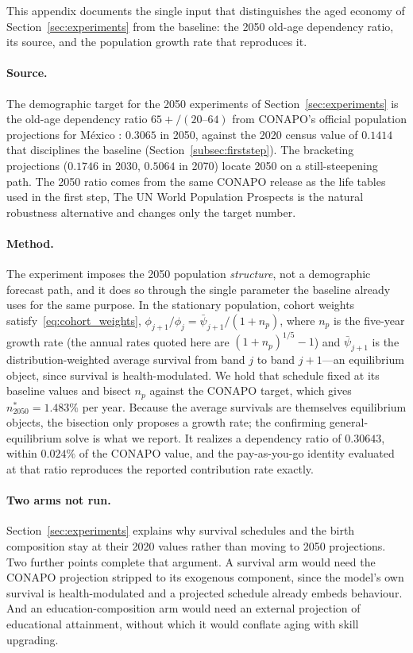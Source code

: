 \documentclass[12pt,a4paper]{article}
\begin{document}
\begin{appendices}
This appendix documents the single input that distinguishes the aged economy of Section~\ref{sec:experiments} from the baseline: the 2050 old-age dependency ratio, its source, and the population growth rate that reproduces it.

\paragraph{Source.} The demographic target for the 2050 experiments of Section~\ref{sec:experiments} is the old-age dependency ratio $65{+}/(20\text{--}64)$ from CONAPO's official population projections for M\'exico \citep[Proyecciones de la Poblaci\'on de M\'exico y de las Entidades Federativas, 2023 revision;][]{CONAPO2023}: $0.3065$ in 2050, against the 2020 census value of $0.1414$ that disciplines the baseline (Section~\ref{subsec:firststep}). The bracketing projections ($0.1746$ in 2030, $0.5064$ in 2070) locate 2050 on a still-steepening path. The 2050 ratio comes from the same CONAPO release as the life tables used in the first step,  The UN World Population Prospects is the natural robustness alternative and changes only the target number.

\paragraph{Method.} The experiment imposes the 2050 population \emph{structure}, not a demographic forecast path, and it does so through the single parameter the baseline already uses for the same purpose. In the stationary population, cohort weights satisfy~\eqref{eq:cohort_weights}, $\phi_{j+1}/\phi_j = \bar\psi_{j+1}/(1+n_p)$, where $n_p$ is the five-year growth rate (the annual rates quoted here are $(1+n_p)^{1/5}-1$) and $\bar\psi_{j+1}$ is the distribution-weighted average survival from band $j$ to band $j+1$---an equilibrium object, since survival is health-modulated. We hold that schedule fixed at its baseline values and bisect $n_p$ against the CONAPO target, which gives $n^{*}_{2050}=1.483\%$ per year. Because the average survivals are themselves equilibrium objects, the bisection only proposes a growth rate; the confirming general-equilibrium solve is what we report. It realizes a dependency ratio of $0.30643$, within $0.024\%$ of the CONAPO value, and the pay-as-you-go identity evaluated at that ratio reproduces the reported contribution rate exactly.

\paragraph{Two arms not run.} Section~\ref{sec:experiments} explains why survival schedules and the birth composition stay at their 2020 values rather than moving to 2050 projections. Two further points complete that argument. A survival arm would need the CONAPO projection stripped to its exogenous component, since the model's own survival is health-modulated and a projected schedule already embeds behaviour. And an education-composition arm would need an external projection of educational attainment, without which it would conflate aging with skill upgrading.



\end{appendices}
\end{document}
